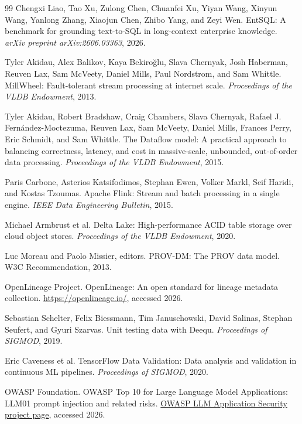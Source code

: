 \documentclass[10pt]{article}
\begin{document}
\begin{thebibliography}{99}
Chengxi Liao, Tao Xu, Zulong Chen, Chuanfei Xu, Yiyan Wang, Xinyun Wang, Yanlong Zhang, Xiaojun Chen, Zhibo Yang, and Zeyi Wen.
\newblock EntSQL: A benchmark for grounding text-to-SQL in long-context enterprise knowledge.
\newblock \emph{arXiv preprint arXiv:2606.03363}, 2026.

Tyler Akidau, Alex Balikov, Kaya Bekiro\u{g}lu, Slava Chernyak, Josh Haberman, Reuven Lax, Sam McVeety, Daniel Mills, Paul Nordstrom, and Sam Whittle.
\newblock MillWheel: Fault-tolerant stream processing at internet scale.
\newblock \emph{Proceedings of the VLDB Endowment}, 2013.

Tyler Akidau, Robert Bradshaw, Craig Chambers, Slava Chernyak, Rafael J. Fern\'andez-Moctezuma, Reuven Lax, Sam McVeety, Daniel Mills, Frances Perry, Eric Schmidt, and Sam Whittle.
\newblock The Dataflow model: A practical approach to balancing correctness, latency, and cost in massive-scale, unbounded, out-of-order data processing.
\newblock \emph{Proceedings of the VLDB Endowment}, 2015.

Paris Carbone, Asterios Katsifodimos, Stephan Ewen, Volker Markl, Seif Haridi, and Kostas Tzoumas.
\newblock Apache Flink: Stream and batch processing in a single engine.
\newblock \emph{IEEE Data Engineering Bulletin}, 2015.

Michael Armbrust et al.
\newblock Delta Lake: High-performance ACID table storage over cloud object stores.
\newblock \emph{Proceedings of the VLDB Endowment}, 2020.

Luc Moreau and Paolo Missier, editors.
\newblock PROV-DM: The PROV data model.
\newblock W3C Recommendation, 2013.

OpenLineage Project.
\newblock OpenLineage: An open standard for lineage metadata collection.
\newblock \url{https://openlineage.io/}, accessed 2026.

Sebastian Schelter, Felix Biessmann, Tim Januschowski, David Salinas, Stephan Seufert, and Gyuri Szarvas.
\newblock Unit testing data with Deequ.
\newblock \emph{Proceedings of SIGMOD}, 2019.

Eric Caveness et al.
\newblock TensorFlow Data Validation: Data analysis and validation in continuous ML pipelines.
\newblock \emph{Proceedings of SIGMOD}, 2020.

OWASP Foundation.
\newblock OWASP Top 10 for Large Language Model Applications: LLM01 prompt injection and related risks.
\newblock \href{https://owasp.org/www-project-top-10-for-large-language-model-applications/}{OWASP LLM Application Security project page}, accessed 2026.


\end{thebibliography}
\end{document}
